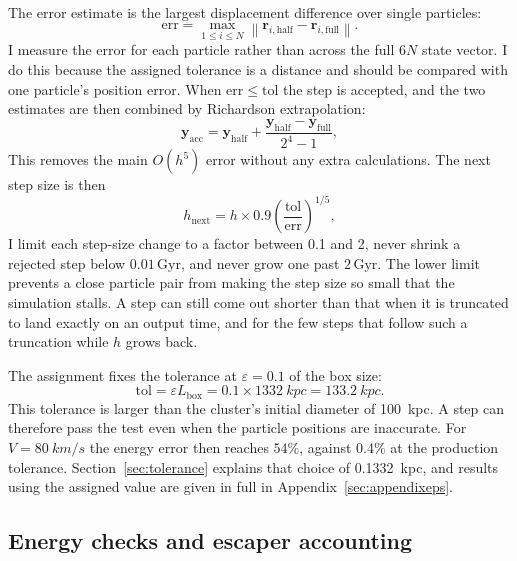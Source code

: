 \documentclass[12pt,a4paper]{article}
\newcommand{\norm}[1]{\left\lVert#1\right\rVert}
\begin{document}
The error estimate is the largest displacement difference over single particles:
\begin{equation}\label{eq:errnorm}
    \mathrm{err}=\max_{1\le i\le N}\norm{\mathbf{r}_{i,\mathrm{half}}
        -\mathbf{r}_{i,\mathrm{full}}}.
\end{equation}
I measure the error for each particle rather than across the full $6N$ state vector. I do this because the assigned tolerance is a distance and should be compared with one particle's position error. When $\mathrm{err}\le\mathrm{tol}$ the step is accepted, and the two estimates are then combined by Richardson extrapolation:
\begin{equation}
    \mathbf{y}_{\mathrm{acc}}=\mathbf{y}_{\mathrm{half}}+
    \frac{\mathbf{y}_{\mathrm{half}}-\mathbf{y}_{\mathrm{full}}}{2^4-1},
\end{equation}
This removes the main $O(h^5)$ error without any extra calculations. The next step size is then
\begin{equation}
    h_{\mathrm{next}} = h \times 0.9 \left(\frac{\mathrm{tol}}{\mathrm{err}}\right)^{1/5},
\end{equation}
I limit each step-size change to a factor between 0.1 and 2, never shrink a rejected step below $0.01\,\mathrm{Gyr}$, and never grow one past $2\,\mathrm{Gyr}$. The lower limit prevents a close particle pair from making the step size so small that the simulation stalls. A step can still come out shorter than that when it is truncated to land exactly on an output time, and for the few steps that follow such a truncation while $h$ grows back.

The assignment fixes the tolerance at $\varepsilon = 0.1$ of the box size:
\begin{equation}\label{eq:tolliteral}
    \mathrm{tol}=\varepsilon L_{\mathrm{box}}=0.1\times\SI{1332}{kpc}=\SI{133.2}{kpc}.
\end{equation}
This tolerance is larger than the cluster's initial diameter of \SI{100}{kpc}. A step can therefore pass the test even when the particle positions are inaccurate. For $V=\SI{80}{km/s}$ the energy error then reaches $54\%$, against $0.4\%$ at the production tolerance. Section~\ref{sec:tolerance} explains that choice of \SI{0.1332}{kpc}, and results using the assigned value are given in full in Appendix~\ref{sec:appendixeps}.

\subsection{Energy checks and escaper accounting}
\end{document}
